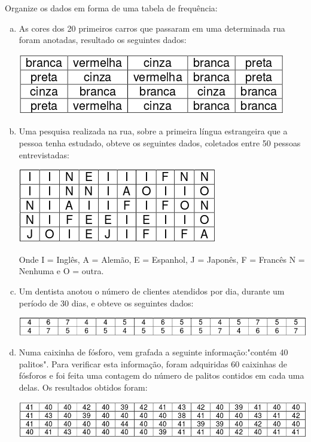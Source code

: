 	\item Organize os dados em forma de uma tabela de frequência:
	\begin{enumerate}[a)]
		\item As  cores  dos  20  primeiros  carros  que  passaram  em  uma  determinada  rua  foram 
anotadas, resultado os seguintes dados:
			\begin{center}
				\includegraphics[scale=0.7]{figuras/fig116.png}
			\end{center}
		\item Uma  pesquisa  realizada  na  rua,  sobre  a  primeira  língua  estrangeira  que  a  pessoa 
tenha estudado, obteve os seguintes dados, coletados entre 50 pessoas entrevistadas:
			\begin{center}
				\includegraphics[scale=0.7]{figuras/fig117.png}
			\end{center}
		Onde I = Inglês, A = Alemão, E = Espanhol, J = Japonês, F = Francês N = Nenhuma e O = outra.
		
		\item Um dentista anotou o número de clientes atendidos por dia, durante um período de 30 dias, e obteve os seguintes dados:
			\begin{center}
				\includegraphics[scale=0.7]{figuras/fig118.png}
			\end{center}
		
		\item Numa  caixinha  de  fósforo,  vem  grafada  a  seguinte  informação:"contém  40  palitos". Para  verificar  esta  informação,  foram  adquiridas  60  caixinhas  de  fósforos  e  foi  feita uma  contagem  do  número  de  palitos  contidos  em  cada  uma  delas.  Os  resultados obtidos foram:
	\begin{center}
		\includegraphics[scale=0.7]{figuras/fig119.png}
	\end{center}
	\end{enumerate}
	
